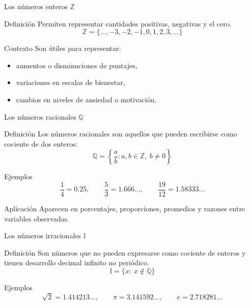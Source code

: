 \documentclass[aspectratio=169,10pt]{beamer}
\begin{document}
	\begin{frame}{Los números enteros \(\mathbb{Z}\)}
		\begin{block}{Definición}
			Permiten representar cantidades positivas, negativas y el cero.
			\[
			\mathbb{Z}=\{\dots,-3,-2,-1,0,1,2,3,\dots\}
			\]
		\end{block}
		
		\begin{exampleblock}{Contexto}
			Son útiles para representar:
			\begin{itemize}
				\item aumentos o disminuciones de puntajes,
				\item variaciones en escalas de bienestar,
				\item cambios en niveles de ansiedad o motivación.
			\end{itemize}
		\end{exampleblock}
	\end{frame}
	
	\begin{frame}{Los números racionales \(\mathbb{Q}\)}
		\begin{block}{Definición}
			Los números racionales son aquellos que pueden escribirse como cociente de dos enteros:
			\[
			\mathbb{Q}=\left\{\frac{a}{b}: a,b\in\mathbb{Z},\ b\neq 0\right\}
			\]
		\end{block}
		
		\begin{exampleblock}{Ejemplos}
			\[
			\frac14=0.25,\qquad \frac53=1.666\dots,\qquad \frac{19}{12}=1.58333\dots
			\]
		\end{exampleblock}
		
		\begin{block}{Aplicación}
			Aparecen en porcentajes, proporciones, promedios y razones entre variables observadas.
		\end{block}
	\end{frame}
	
	\begin{frame}{Los números irracionales \(\mathbb{I}\)}
		\begin{block}{Definición}
			Son números que no pueden expresarse como cociente de enteros y tienen desarrollo decimal infinito no periódico.
			\[
			\mathbb{I}=\{x:\ x\notin\mathbb{Q}\}
			\]
		\end{block}
		
		\begin{exampleblock}{Ejemplos}
			\[
			\sqrt{2}=1.414213\dots,\qquad \pi=3.141592\dots,\qquad e=2.718281\dots
			\]
		\end{exampleblock}
	\end{frame}
	
\end{document}
